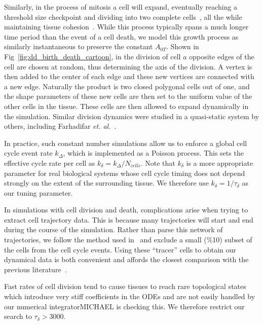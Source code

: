 \documentclass[
reprint
,aps
,amssymb
,amsmath
,superscriptaddress
]{revtex4-1}
\newcommand{\dms}[1]{{\color{magenta}#1}}
\begin{document}
Similarly, in the process of mitosis a cell will expand, eventually reaching a threshold size checkpoint and dividing into two complete cells~\cite{Conlon2003,Dolznig2004,Streichan2014}, all the while maintaining tissue cohesion~\cite{Baker1993}. While this process typically spans a much longer time period than the event of a cell death, we model this growth process as similarly instantaneous to preserve the constant $A_{0T}$. Shown in Fig~\ref{fig:dd_birth_death_cartoon}, in the division of cell $a$ opposite edges of the cell are chosen at random, thus determining the axis of the division. A vertex is then added to the center of each edge and these new vertices are connected with a new edge. Naturally the product is two closed polygonal cells out of one, and the shape parameters of these new cells are then set to the uniform value of the other cells in the tissue. These cells are then allowed to expand dynamically in the simulation. Similar division dynamics were studied in a quasi-static system by others, including Farhadifar \textit{et. al.}~\cite{Farhadifar2007}.

In practice, such constant number simulations allow us to enforce a global cell cycle event rate $k_\Delta$, which is implemented as a Poisson process. This sets the effective cycle rate per cell as $k_\delta = k_\Delta / N_{cells}$. Note that $k_\delta$ is a more appropriate parameter for real biological systems whose cell cycle timing does not depend strongly on the extent of the surrounding tissue. We therefore use $k_\delta = 1/\tau_\delta$ as our tuning parameter.

In simulations with cell division and death, complications arise when trying to extract cell trajectory data. This is because many trajectories will start and end during the course of the simulation. Rather than parse this network of trajectories, we follow the method used in~\cite{Matoz-Fernandez2017-1} and exclude a small (\%10) subset of the cells from the cell cycle events. Using these ``tracer'' cells to obtain our dynamical data is both convenient and affords the closest comparison with the previous literature~\cite{Matoz-Fernandez2017-1}. 

Fast rates of cell division tend to cause tissues to reach rare topological states which introduce very stiff coefficients in the ODEs and are not easily handled by our numerical integrator\dms{MICHAEL is checking this}. We therefore restrict our search to $\tau_\delta > 3000$.%
\end{document}
